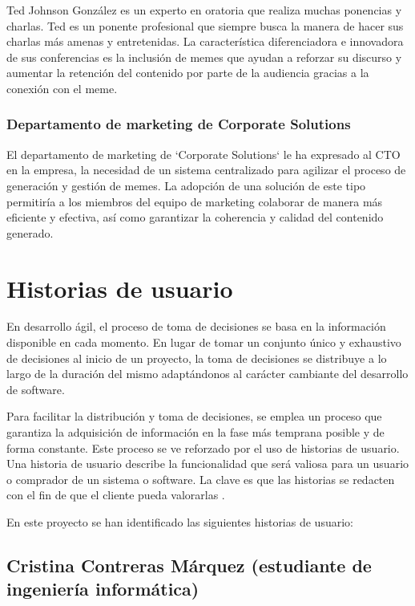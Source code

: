     Ted Johnson González es un experto en oratoria que realiza muchas ponencias y charlas. Ted es un ponente profesional que siempre busca la manera de hacer sus charlas más amenas y entretenidas. La característica diferenciadora e innovadora de sus conferencias es la inclusión de memes que ayudan a reforzar su discurso y aumentar la retención del contenido por parte de la audiencia gracias a la conexión con el meme.

    \subsubsection{Departamento de marketing de Corporate Solutions}

    El departamento de marketing de `Corporate Solutions` le ha expresado al CTO en la empresa, la necesidad de un sistema centralizado para agilizar el proceso de generación y gestión de memes. La adopción de una solución de este tipo permitiría a los miembros del equipo de marketing colaborar de manera más eficiente y efectiva, así como garantizar la coherencia y calidad del contenido generado. 

\section{Historias de usuario}

    En desarrollo ágil, el proceso de toma de decisiones se basa en la información disponible en cada momento. En lugar de tomar un conjunto único y exhaustivo de decisiones al inicio de un proyecto, la toma de decisiones se distribuye a lo largo de la duración del mismo adaptándonos al carácter cambiante del desarrollo de software.
    
    Para facilitar la distribución y toma de decisiones, se emplea un proceso que garantiza la adquisición de información en la fase más temprana posible y de forma constante. Este proceso se ve reforzado por el uso de historias de usuario. Una historia de usuario describe la funcionalidad que será valiosa para un usuario o comprador de un sistema o software. La clave es que las historias se redacten con el fin de que el cliente pueda valorarlas \cite{cohn2004user}.

    En este proyecto se han identificado las siguientes historias de usuario:

    \subsection{Cristina Contreras Márquez (estudiante de ingeniería informática)}

